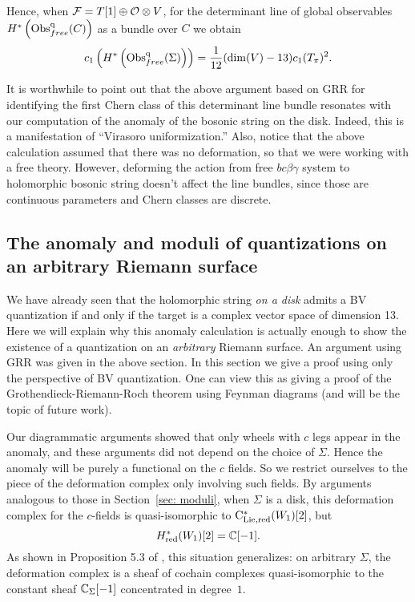 Hence, when $\mathcal F = T[1] \oplus \mathcal O \otimes V$, for the determinant line of global observables $H^*\left({\rm Obs}^{\rm q}_{free}(C)\right)$ as a bundle over $C$ we obtain
\[
c_1\left(H^*\left({\rm Obs}^{\rm q}_{free}(\Sigma)\right)\right) = \frac{1}{12} (\dim(V) - 13) c_1(T_\pi)^2 .
\]


It is worthwhile to point out that the above argument based on GRR for identifying the first Chern class of this determinant line bundle resonates with our computation of the anomaly of the bosonic string on the disk. Indeed, this is a manifestation of ``Virasoro uniformization.'' 
Also, notice that the above calculation assumed that there was no deformation, so that we were working with a free theory. 
However, deforming the action from free $bc\beta\gamma$ system to holomorphic bosonic string doesn't affect the line bundles, since those are continuous parameters and Chern classes are discrete.

\subsection{The anomaly and moduli of quantizations on an arbitrary Riemann surface}

We have already seen that the holomorphic string {\it on a disk} admits a BV quantization if and only if the target is a complex vector space of dimension 13.
Here we will explain why this anomaly calculation is actually enough to show the existence of a quantization on an {\it arbitrary} Riemann surface. 
An argument using GRR was given in the above section. 
In this section we give a proof using only the perspective of BV quantization.
One can view this as giving a proof of the Grothendieck-Riemann-Roch theorem using Feynman diagrams (and will be the topic of future work). 

Our diagrammatic arguments showed that only wheels with $c$ legs appear in the anomaly,
and these arguments did not depend on the choice of $\Sigma$. 
Hence the anomaly will be purely a functional on the $c$ fields.
So we restrict ourselves to the piece of the deformation complex only involving such fields.
By arguments analogous to those in Section~\ref{sec: moduli}, 
when $\Sigma$ is a disk,
this deformation complex for the $c$-fields is quasi-isomorphic to ${\rm C}_{\rm Lie,red}^*(W_1)[2]$,
but
\[
H^*_{\rm red}(W_1)[2] = \mathbb C[-1].
\]
As shown in Proposition 5.3 of \cite{BWvir}, this situation generalizes:
on arbitrary $\Sigma$, 
the deformation complex is a sheaf of cochain complexes quasi-isomorphic to the constant sheaf $\mathbb C_\Sigma[-1]$ concentrated in degree~$1$. 

